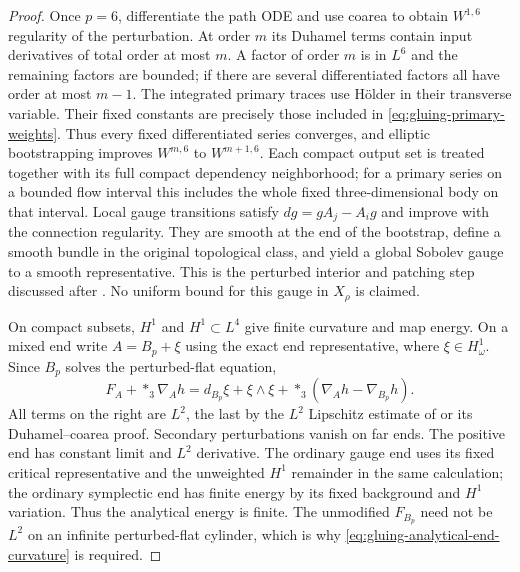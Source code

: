 \documentclass[11pt]{amsart}
\theoremstyle{definition}
\theoremstyle{remark}
\theoremstyle{plain}
\begin{document}
\begin{proof}
Once $p=6$, differentiate the path ODE and use coarea to obtain
$W^{1,6}$ regularity of the perturbation. At order $m$ its
Duhamel terms contain input derivatives of total order at most $m$.
A factor of order $m$ is in $L^6$ and the remaining factors
are bounded; if there are several differentiated factors all have
order at most $m-1$. The integrated primary traces use H\"older
in their transverse variable. Their fixed constants are precisely
those included in \eqref{eq:gluing-primary-weights}. Thus every
fixed differentiated series converges, and elliptic bootstrapping
improves $W^{m,6}$ to $W^{m+1,6}$. Each compact output set
is treated together with its full compact dependency neighborhood;
for a primary series on a bounded flow interval this includes the
whole fixed three-dimensional body on that interval. Local gauge
transitions satisfy $dg=gA_j-A_i g$ and improve with the connection
regularity. They are smooth at the end of the bootstrap, define a
smooth bundle in the original topological class, and yield a global
Sobolev gauge to a smooth representative. This is the perturbed
interior and patching step discussed after
\cite[Theorem~5.4]{DaeFukLip21a}. No uniform bound for this
gauge in $X_\rho$ is claimed.

On compact subsets, $H^1$ and $H^1\subset L^4$ give finite
curvature and map energy. On a mixed end write $A=B_p+\xi$
using the exact end representative, where $\xi\in H^1_\omega$.
Since $B_p$ solves the perturbed-flat equation,
\begin{equation}\label{eq:gluing-analytical-end-curvature}
 F_A+*_3\nabla_Ah
       =d_{B_p}\xi+\xi\wedge\xi
                           +*_3(\nabla_Ah-\nabla_{B_p}h).
\end{equation}
All terms on the right are $L^2$, the last by the $L^2$
Lipschitz estimate of \cite[Proposition~6.1(ii)]{DaeFukLip21a}
or its Duhamel--coarea proof. Secondary perturbations vanish on
far ends. The positive end has constant limit and $L^2$ derivative.
The ordinary gauge end uses its fixed critical representative and
the unweighted $H^1$ remainder in the same calculation; the
ordinary symplectic end has finite energy by its fixed background
and $H^1$ variation. Thus the analytical energy is finite.
The unmodified $F_{B_p}$ need not be $L^2$ on an infinite
perturbed-flat cylinder, which is why
\eqref{eq:gluing-analytical-end-curvature} is required.


\end{proof}
\end{document}
